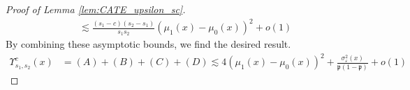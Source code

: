 \begin{proof}[Proof of Lemma \ref{lem:CATE_upsilon_sc}]
\begin{equation}
\begin{aligned}
			& \lesssim  \frac{(s_1 - c)(s_2 - s_1)}{s_1 s_2} \left(\mu_1(x) - \mu_0(x)\right)^2 + o(1)
		\end{aligned}
	\end{equation}
	By combining these asymptotic bounds, we find the desired result.
	\begin{equation}
		\begin{aligned}
			\Upsilon_{s_1, s_2}^{c}\left(x\right)
			& = (A) + (B) + (C) + (D)
			\lesssim 4 \left(\mu_1(x) - \mu_0(x)\right)^2 + \frac{\sigma^2_{\varepsilon}(x)}{\mathfrak{p}(1 - \mathfrak{p})} + o(1)
		\end{aligned}
	\end{equation}
\end{proof}